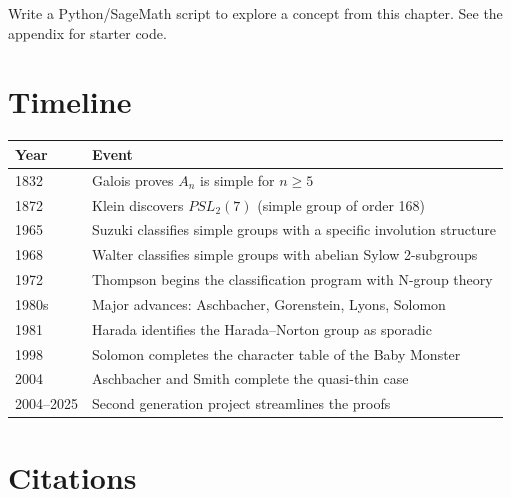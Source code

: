 \begin{exercise}[Computational]
Write a Python/SageMath script to explore a concept from this chapter. See the appendix for starter code.
\end{exercise}

\section{Timeline}

\begin{tabularx}{\linewidth}{lX}
\toprule
\textbf{Year} & \textbf{Event} \\ \midrule
1832 & Galois proves $A_n$ is simple for $n \geq 5$ \cite{galois1832} \\ 
1872 & Klein discovers $PSL_2(7)$ (simple group of order 168) \cite{klein1872} \\ 
1965 & Suzuki classifies simple groups with a specific involution structure \cite{suzuki1965} \\ 
1968 & Walter classifies simple groups with abelian Sylow 2-subgroups \cite{walter1968} \\ 
1972 & Thompson begins the classification program with N-group theory \cite{thompson1972} \\ 
1980s & Major advances: Aschbacher, Gorenstein, Lyons, Solomon \cite{gls1994} \\ 
1981 & Harada identifies the Harada--Norton group as sporadic \cite{harada1981} \\ 
1998 & Solomon completes the character table of the Baby Monster \cite{solomon1998} \\ 
2004 & Aschbacher and Smith complete the quasi-thin case \cite{aschbacher2004} \\ 
2004--2025 & Second generation project streamlines the proofs \cite{gls1994} \\ \bottomrule
\end{tabularx}

\section{Citations}

